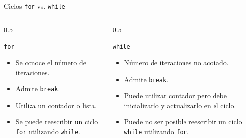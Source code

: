 \documentclass[mathserif]{beamer}
\begin{document}
\begin{frame}{Ciclos \lstinline|for| vs. \lstinline|while|}
    \begin{columns}
        \begin{column}{0.5\textwidth}
        \begin{cpage}
            \centering\lstinline|for|
        \end{cpage}
        \begin{itemize}
            \item Se {\blue conoce} el número de iteraciones.
            \item Admite \lstinline|break|.
            \item Utiliza un {\blue contador} o {\blue lista}.
            \item Se puede {\blue reescribir} un ciclo \lstinline|for| utilizando \lstinline|while|.
        \end{itemize}
        \end{column}
        \begin{column}{0.5\textwidth}
        \begin{cpage}
            \centering\lstinline|while|
        \end{cpage}
        \begin{itemize}
            \item Número de iteraciones no acotado. 
            \item Admite \lstinline|break|.
            \item Puede utilizar {\blue contador} pero {\orange debe inicializarlo y actualizarlo} en el ciclo.
            \item Puede {\orange no} ser posible {\blue reescribir} un ciclo \lstinline|while| utilizando \lstinline|for|.
        \end{itemize}
        \end{column}
    \end{columns}
\end{frame}
\end{document}
